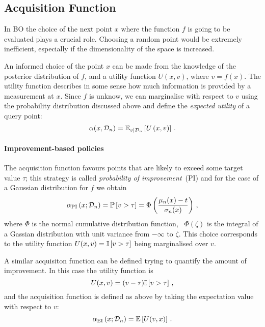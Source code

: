 \subsection{Acquisition Function}
\label{sec:AcqFun}

In BO the choice of the next point $x$ where the function $f$ is going to be
evaluated plays a crucial role. Choosing a random point would be extremely
inefficient, especially if the dimensionality of the space is increased. 

An informed choice of the point $x$ can be made from the knowledge of the
posterior distribution of $f$, and a utility function $U(x,v)$, where $v=f(x)$.
The utility function describes in some sense how much information is provided by
a measurement at $x$. Since $f$ is unknow, we can marginalise with respect to
$v$ using the probability distribution discussed above and define the {\em
expected utility} of a query point:
\begin{equation}
    \label{eq:ExpUtilDef}
    \alpha(x,\mathcal{D}_n) = \mathbb{E}_{v|\mathcal{D}_n}\left[U\left(x,v\right)\right]\, .
\end{equation} 

\paragraph[]{Improvement-based policies}

The acquisition function favours points that are likely to exceed some target value $\tau$; this strategy is called {\em probability of improvement}\ (PI) and for the case of a Gaussian distribution for $f$ we obtain
\begin{equation}
    \label{eq:AlphaPI}
    \alpha_{\mathrm{PI}}\left(x;\mathcal{D}_n\right) = 
    \mathbb{P}\left[v>\tau\right] = 
    \Phi\left(
        \frac{\mu_n(x)-t}{\sigma_n(x)}    
    \right)\, ,
\end{equation}
where $\Phi$ is the normal cumulative distribution function, \ie\ $\Phi(\zeta)$
is the integral of a Gassian distribution with unit variance from $-\infty$ to
$\zeta$. This choice corresponds to the utility function
$U(x,v)=\mathbb{I}\left[v>\tau\right]$ being marginalised over $v$.

A similar acquisiton function can be defined trying to quantify the amount of
improvement. In this case the utility function is
\begin{equation}
    \label{eq:EIUtil}
    U(x,v) = (v-\tau) \mathbb{I}\left[v>\tau\right]\, ,
\end{equation}
and the acquisition function is defined as above by taking the expectation value with respect to $v$:
\begin{equation}
    \label{eq:EIAcq}
    \alpha_{\mathrm{EI}} \left(x;\mathcal{D}_n\right) = 
    \mathbb{E}\left[U(v,x)\right]\, .
\end{equation}
